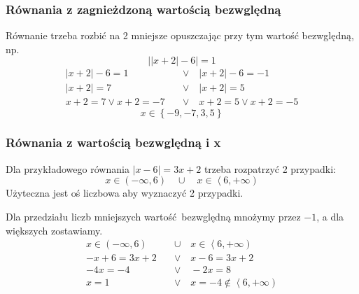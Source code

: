 \documentclass[12pt, a4paper]{article}
\begin{document}
\subsubsection*{Równania z zagnieżdzoną wartością bezwględną}
Równanie trzeba rozbić na 2 mniejsze opuszczając przy tym wartość bezwglę\-dną, np.
$$\left|\left|x+2\right|-6\right|=1$$
\begin{align*}
\left|x+2\right|-6=1 \quad & \vee \quad \left|x+2\right|-6=-1 \\
\left|x+2\right|=7 \quad & \vee \quad \left|x+2\right|=5 \\
x+2=7 \vee x+2=-7 \hspace{1em} & \vee \hspace{1em} x+2=5 \vee x+2=-5
\end{align*}
$$x \in \left\{ -9, -7, 3, 5\right\}$$


\subsubsection*{Równania z wartością bezwględną i x}
Dla przykładowego równania $\left|x-6\right|=3x+2$ trzeba rozpatrzyć 2 przypadki:
$$x \in \left( -\infty , 6\right) \quad \cup \quad x \in \left\langle 6, +\infty \right)$$
Użyteczna jest oś liczbowa aby wyznaczyć 2 przypadki.
    \begin{center}
    \end{center}
Dla przedziału liczb mniejszych wartość bezwględną mnożymy przez $-1$, a dla większych zostawiamy.
\begin{align*}
x \in \left( -\infty , 6\right) \quad & \cup \quad x \in \left\langle 6, +\infty \right) \\
-x+6=3x+2 \quad & \vee \quad x-6=3x+2 \\
-4x = -4 \quad & \vee \quad -2x = 8 \\
x = 1 \quad & \vee \quad x = -4 \notin \left\langle6, +\infty\right)
\end{align*}
\end{document}
